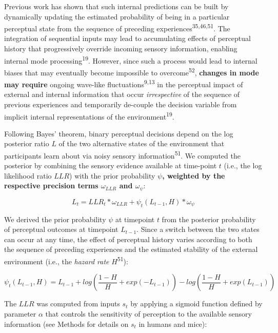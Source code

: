 \documentclass[
]{article}
\begin{document}
Previous work has shown that such internal predictions can be built by
dynamically updating the estimated probability of being in a particular
perceptual state from the sequence of preceding
experiences\textsuperscript{35,46,51}. The integration of sequential
inputs may lead to accumulating effects of perceptual history that
progressively override incoming sensory information, enabling internal
mode processing\textsuperscript{19}. However, since such a process would
lead to internal biases that may eventually become impossible to
overcome\textsuperscript{52}, \textbf{changes in mode may require}
ongoing wave-like fluctuations\textsuperscript{9,13} in the perceptual
impact of external and internal information that occur
\emph{irrespective} of the sequence of previous experiences and
temporarily de-couple the decision variable from implicit internal
representations of the environment\textsuperscript{19}.

Following Bayes' theorem, binary perceptual decisions depend on the log
posterior ratio \(L\) of the two alternative states of the environment
that participants learn about via noisy sensory
information\textsuperscript{51}. We computed the posterior by combining
the sensory evidence available at time-point \(t\) (i.e., the log
likelihood ratio \(LLR\)) with the prior probability \(\psi\)\textbf{,
weighted by the respective precision terms \(\omega_{LLR}\) and
\(\omega_{\psi}\)}:

\begin{equation}
L_t = LLR_t * \omega_{LLR} + \psi_t(L_{t-1}, H) * \omega_{\psi}
\end{equation}

We derived the prior probability \(\psi\) at timepoint \(t\) from the
posterior probability of perceptual outcomes at timepoint \(L_{t-1}\).
Since a switch between the two states can occur at any time, the effect
of perceptual history varies according to both the sequence of preceding
experiences and the estimated stability of the external environment
(i.e., the \emph{hazard rate} \(H\)\textsuperscript{51}):

\begin{equation}
\psi_t(L_{t-1}, H)  = L_{t-1} + log(\frac{1-H}{H} + exp(-L_{t-1})) - log(\frac{1-H}{H} + exp(L_{t-1}))
\end{equation}

The \(LLR\) was computed from inputs \(s_t\) by applying a sigmoid
function defined by parameter \(\alpha\) that controls the sensitivity
of perception to the available sensory information (see Methods for
details on \(s_t\) in humans and mice):
\end{document}
